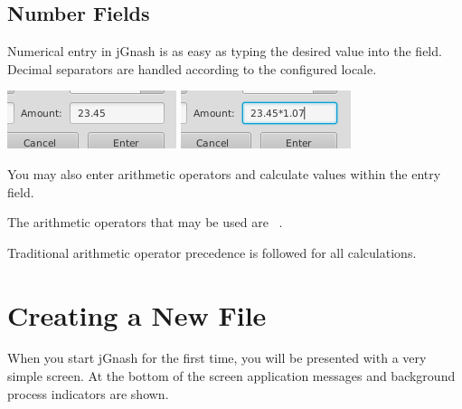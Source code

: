 \documentclass[letterpaper,12pt]{book}
\begin{document}
    \subsection{Number Fields}\label{subsec:numberFields}

    Numerical entry in jGnash is as easy as typing the desired value into the field.
    Decimal separators are handled according to the configured locale.

    \includegraphics[scale=0.8]{images/basic-decimal-entry} \hspace{10pt} \includegraphics[scale=0.8]{images/advanced-decimal-entry}

    You may also enter arithmetic operators and calculate values within the entry field.

    The arithmetic operators that may be used are \keys{(} \keys{)} \keys{{+}} \keys{{-}} \keys{$\star$} \keys{/}  \keys{,}~.

    Traditional arithmetic operator precedence is followed for all calculations.

    \section{Creating a New File}\label{sec:creating-a-new-file}

    When you start jGnash for the first time, you will be presented with a very simple screen.
    At the bottom of the screen application messages and background process indicators are shown.
\end{document}
